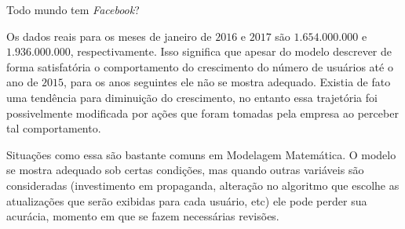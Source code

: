 \documentclass[extrafontsizes, twoside, 11pt, openright, final]{memoir}
\begin{document}
\begin{task}{ Todo mundo tem \emph{Facebook}?}
\begin{enumerate}
	\end{enumerate}

	Os dados reais para os meses de janeiro de $2016$ e $2017$ são $1.654.000.000$ e $1.936.000.000$, respectivamente. Isso significa que apesar do modelo descrever de forma satisfatória o comportamento do crescimento do número de usuários até o ano de $2015$, para os anos seguintes ele não se mostra adequado. Existia de fato uma tendência para diminuição do crescimento, no entanto essa trajetória foi possivelmente modificada por ações que foram tomadas pela empresa ao perceber tal comportamento.

	Situações como essa são bastante comuns em Modelagem Matemática. O modelo se mostra adequado sob certas condições, mas quando outras variáveis são consideradas (investimento em propaganda, alteração no algoritmo que escolhe as atualizações que serão exibidas para cada usuário, etc) ele pode perder sua acurácia, momento em que se fazem necessárias revisões.

\end{task}
\end{document}

